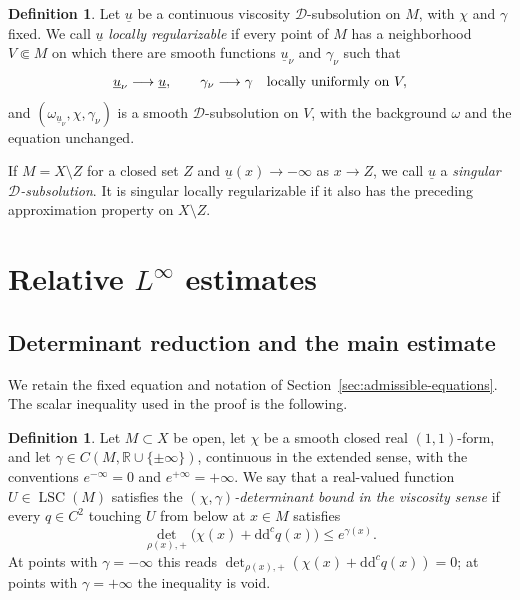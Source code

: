 \documentclass[oneside,english,letterpaper]{amsart}
\numberwithin{equation}{section}
\theoremstyle{plain}
\theoremstyle{definition}
\newtheorem{defn}[thm]{Definition}
\theoremstyle{remark}
\renewcommand{\d}{\mathrm{d}}
\newcommand{\ddc}{\d\d^c}
\begin{document}
\begin{defn}
	\label{def:regularizable-D-subsolution}
	Let $\underline u$ be a continuous viscosity $\mathcal D$-subsolution
	on $M$, with $\chi$ and $\gamma$ fixed. We call $\underline u$
	\emph{locally regularizable} if every point of $M$ has a neighborhood
	$V\Subset M$ on which there are smooth functions $\underline u_\nu$
	and $\gamma_\nu$ such that
	$$
	\underline u_\nu\longrightarrow\underline u,
	\qquad \gamma_\nu\longrightarrow\gamma
	\quad\hbox{locally uniformly on }V,
	$$
	and $(\omega_{\underline u_\nu},\chi,\gamma_\nu)$ is a smooth
	$\mathcal D$-subsolution on $V$, with the background $\omega$ and
	the equation unchanged.
	
	If $M=X\setminus Z$ for a closed set $Z$ and
	$\underline u(x)\to-\infty$ as $x\to Z$, we call $\underline u$ a
	\emph{singular $\mathcal D$-subsolution}. It is singular locally
	regularizable if it also has the preceding approximation property
	on $X\setminus Z$.
\end{defn}

\section{Relative \texorpdfstring{$L^\infty$}{L-infinity} estimates}
\label{sec:relative-Linfty}

\subsection{Determinant reduction and the main estimate}
\label{subsec:viscosity-relative-Linfty}

We retain the fixed equation and notation of
Section~\ref{sec:admissible-equations}. The scalar inequality used
in the proof is the following.

\begin{defn}
	\label{def:viscosity-determinant-bound}
	Let $M\subset X$ be open, let $\chi$ be a smooth closed real
	$(1,1)$-form, and let $\gamma\in C(M,\mathbb R\cup\{\pm\infty\})$,
	continuous in the extended sense, with the conventions
	$e^{-\infty}=0$ and $e^{+\infty}=+\infty$. We say that a
	real-valued function $U\in\operatorname{LSC}(M)$ satisfies the
	\emph{$(\chi,\gamma)$-determinant bound in the viscosity sense}
	if every $q\in C^2$ touching $U$ from below at $x\in M$ satisfies
	\begin{equation}
		\label{eq:viscosity-determinant-bound}
		\det_{\rho(x),+}\bigl(\chi(x)+\ddc q(x)\bigr)\leq e^{\gamma(x)}.
	\end{equation}
	At points with $\gamma=-\infty$ this reads
	$\det_{\rho(x),+}(\chi(x)+\ddc q(x))=0$; at points with
	$\gamma=+\infty$ the inequality is void.
\end{defn}
\end{document}
